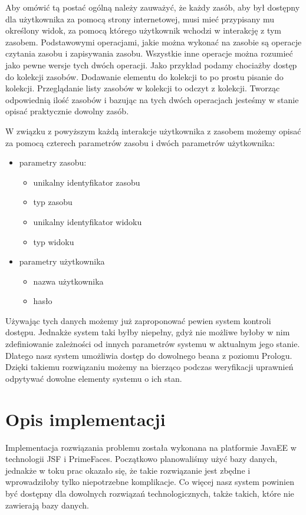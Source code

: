 \documentclass{classrep}
\begin{document}
Aby omówić tą postać ogólną należy zauważyć, że każdy zasób, aby był dostępny dla użytkownika za pomocą strony internetowej, musi mieć przypisany mu określony widok, za pomocą którego użytkownik
wchodzi w interakcję z tym zasobem. Podstawowymi operacjami, jakie można wykonać na zasobie są operacje czytania zasobu i zapisywania zasobu. Wszystkie inne operacje można
rozumieć jako pewne wersje tych dwóch operacji. Jako przykład podamy chociażby dostęp do kolekcji zasobów. Dodawanie elementu do kolekcji to po prostu pisanie do kolekcji.
Przeglądanie listy zasobów w kolekcji to odczyt z kolekcji. Tworząc odpowiednią ilość zasobów i bazując na tych dwóch operacjach jesteśmy w stanie opisać praktycznie dowolny zasób.

W związku z powyższym każdą interakcje użytkownika z zasobem możemy opisać za pomocą czterech parametrów zasobu i dwóch parametrów użytkownika:
\begin{itemize}
  \item parametry zasobu:
  \begin{itemize}
    \item unikalny identyfikator zasobu
    \item typ zasobu
    \item unikalny identyfikator widoku
    \item typ widoku
  \end{itemize}
  \item parametry użytkownika
  \begin{itemize}
    \item nazwa użytkownika
    \item hasło
  \end{itemize}
\end{itemize}

Używając tych danych możemy już zaproponować pewien system kontroli dostępu. Jednakże system taki byłby niepełny, gdyż nie możliwe byłoby w nim zdefiniowanie zależności od innych
parametrów systemu w aktualnym jego stanie. Dlatego nasz system umożliwia dostęp do dowolnego beana z poziomu Prologu. Dzięki takiemu rozwiązaniu możemy na bierząco podczas weryfikacji
uprawnień odpytywać dowolne elementy systemu o ich stan.

\section{Opis implementacji}

Implementacja rozwiązania problemu została wykonana na platformie JavaEE w technologii JSF i PrimeFaces. Początkowo planowaliśmy użyć bazy danych, jednakże w toku prac okazało się,
że takie rozwiązanie jest zbędne i wprowadziłoby tylko niepotrzebne komplikacje. Co więcej nasz system powinien być dostępny dla dowolnych rozwiązań technologicznych, także takich, które nie
zawierają bazy danych.
\end{document}
